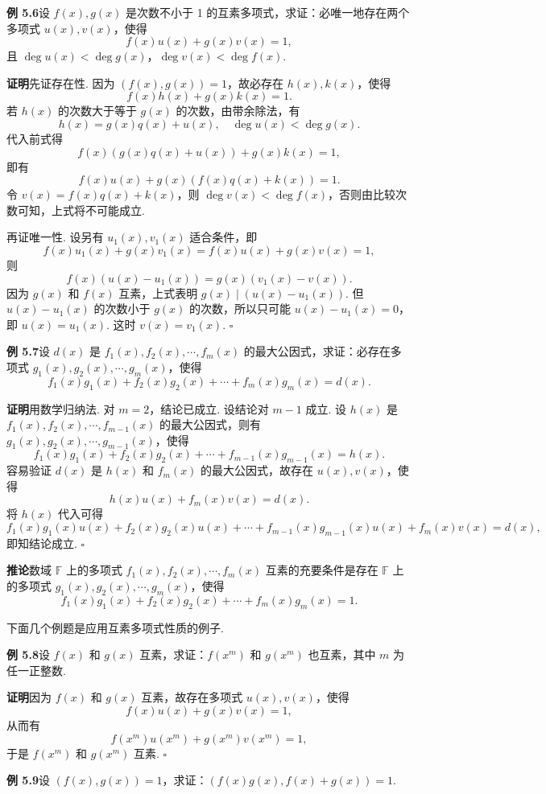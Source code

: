 \documentclass[UTF8, 12pt, fontset=fandol, oneside]{ctexart}
\begin{document}
\noindent\textbf{例 5.6}\quad 设 $f(x),g(x)$ 是次数不小于 1 的互素多项式，求证：必唯一地存在两个多项式 $u(x),v(x)$，使得
\[
f(x)u(x)+g(x)v(x)=1,
\]
且 $\deg u(x)<\deg g(x)$，$\deg v(x)<\deg f(x)$.

\noindent\textbf{证明}\quad 先证存在性. 因为 $(f(x),g(x))=1$，故必存在 $h(x),k(x)$，使得
\[
f(x)h(x)+g(x)k(x)=1.
\]
若 $h(x)$ 的次数大于等于 $g(x)$ 的次数，由带余除法，有
\[
h(x)=g(x)q(x)+u(x),\quad \deg u(x)<\deg g(x).
\]
代入前式得
\[
f(x)(g(x)q(x)+u(x))+g(x)k(x)=1,
\]
即有
\[
f(x)u(x)+g(x)(f(x)q(x)+k(x))=1.
\]
令 $v(x)=f(x)q(x)+k(x)$，则 $\deg v(x)<\deg f(x)$，否则由比较次数可知，上式将不可能成立.

再证唯一性. 设另有 $u_1(x),v_1(x)$ 适合条件，即
\[
f(x)u_1(x)+g(x)v_1(x)=f(x)u(x)+g(x)v(x)=1,
\]
则
\[
f(x)(u(x)-u_1(x))=g(x)(v_1(x)-v(x)).
\]
因为 $g(x)$ 和 $f(x)$ 互素，上式表明 $g(x)\mid (u(x)-u_1(x))$. 但 $u(x)-u_1(x)$ 的次数小于 $g(x)$ 的次数，所以只可能 $u(x)-u_1(x)=0$，即 $u(x)=u_1(x)$. 这时 $v(x)=v_1(x)$. \hfill $\square$

\noindent\textbf{例 5.7}\quad 设 $d(x)$ 是 $f_1(x),f_2(x),\cdots,f_m(x)$ 的最大公因式，求证：必存在多项式 $g_1(x),g_2(x),\cdots,g_m(x)$，使得
\[
f_1(x)g_1(x)+f_2(x)g_2(x)+\cdots+f_m(x)g_m(x)=d(x).
\]

\noindent\textbf{证明}\quad 用数学归纳法. 对 $m=2$，结论已成立. 设结论对 $m-1$ 成立. 设 $h(x)$ 是 $f_1(x),f_2(x),\cdots,f_{m-1}(x)$ 的最大公因式，则有 $g_1(x),g_2(x),\cdots,g_{m-1}(x)$，使得
\[
f_1(x)g_1(x)+f_2(x)g_2(x)+\cdots+f_{m-1}(x)g_{m-1}(x)=h(x).
\]
容易验证 $d(x)$ 是 $h(x)$ 和 $f_m(x)$ 的最大公因式，故存在 $u(x),v(x)$，使得
\[
h(x)u(x)+f_m(x)v(x)=d(x).
\]
将 $h(x)$ 代入可得
\[
f_1(x)g_1(x)u(x)+f_2(x)g_2(x)u(x)+\cdots+f_{m-1}(x)g_{m-1}(x)u(x)+f_m(x)v(x)=d(x),
\]
即知结论成立. \hfill $\square$

\noindent\textbf{推论}\quad 数域 $\mathbb{F}$ 上的多项式 $f_1(x),f_2(x),\cdots,f_m(x)$ 互素的充要条件是存在 $\mathbb{F}$ 上的多项式 $g_1(x),g_2(x),\cdots,g_m(x)$，使得
\[
f_1(x)g_1(x)+f_2(x)g_2(x)+\cdots+f_m(x)g_m(x)=1.
\]

下面几个例题是应用互素多项式性质的例子.

\noindent\textbf{例 5.8}\quad 设 $f(x)$ 和 $g(x)$ 互素，求证：$f(x^m)$ 和 $g(x^m)$ 也互素，其中 $m$ 为任一正整数.

\noindent\textbf{证明}\quad 因为 $f(x)$ 和 $g(x)$ 互素，故存在多项式 $u(x),v(x)$，使得
\[
f(x)u(x)+g(x)v(x)=1,
\]
从而有
\[
f(x^m)u(x^m)+g(x^m)v(x^m)=1,
\]
于是 $f(x^m)$ 和 $g(x^m)$ 互素. \hfill $\square$

\noindent\textbf{例 5.9}\quad 设 $(f(x),g(x))=1$，求证：$(f(x)g(x),f(x)+g(x))=1$.
\end{document}
